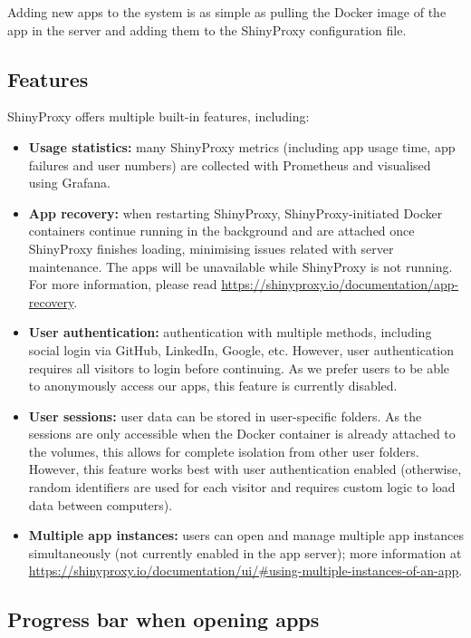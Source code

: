 Adding new apps to the system is as simple as pulling the Docker image of the app in the server and adding them to the ShinyProxy configuration file.

\subsection{Features}

ShinyProxy offers multiple built-in features, including:

\begin{itemize}
	\item \textbf{Usage statistics:} many ShinyProxy metrics (including app usage time, app failures and user numbers) are collected with Prometheus and visualised using Grafana.
    \item \textbf{App recovery:} when restarting ShinyProxy, ShinyProxy-initiated Docker containers continue running in the background and are attached once ShinyProxy finishes loading, minimising issues related with server maintenance. The apps will be unavailable while ShinyProxy is not running. For more information, please read \url{https://shinyproxy.io/documentation/app-recovery}.
    \item \textbf{User authentication:} authentication with multiple methods, including social login via GitHub, LinkedIn, Google, etc. However, user authentication requires all visitors to login before continuing. As we prefer users to be able to anonymously access our apps, this feature is currently disabled.
    \item \textbf{User sessions:} user data can be stored in user-specific folders. As the sessions are only accessible when the Docker container is already attached to the volumes, this allows for complete isolation from other user folders. However, this feature works best with user authentication enabled (otherwise, random identifiers are used for each visitor and requires custom logic to load data between computers).
	\item \textbf{Multiple app instances:} users can open and manage multiple app instances simultaneously (not currently enabled in the app server); more information at \url{https://shinyproxy.io/documentation/ui/#using-multiple-instances-of-an-app}.
\end{itemize}

\subsection{Progress bar when opening apps}

